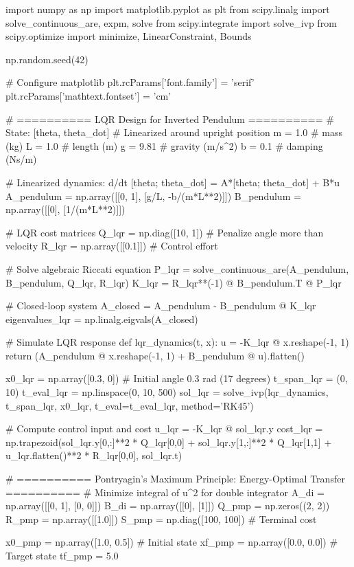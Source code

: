 \documentclass[a4paper, 11pt]{article}
\begin{document}
\begin{pycode}
import numpy as np
import matplotlib.pyplot as plt
from scipy.linalg import solve_continuous_are, expm, solve
from scipy.integrate import solve_ivp
from scipy.optimize import minimize, LinearConstraint, Bounds

np.random.seed(42)

# Configure matplotlib
plt.rcParams['font.family'] = 'serif'
plt.rcParams['mathtext.fontset'] = 'cm'

# ========== LQR Design for Inverted Pendulum ==========
# State: [theta, theta_dot]
# Linearized around upright position
m = 1.0  # mass (kg)
L = 1.0  # length (m)
g = 9.81  # gravity (m/s^2)
b = 0.1  # damping (Ns/m)

# Linearized dynamics: d/dt [theta; theta_dot] = A*[theta; theta_dot] + B*u
A_pendulum = np.array([[0, 1],
                       [g/L, -b/(m*L**2)]])
B_pendulum = np.array([[0],
                       [1/(m*L**2)]])

# LQR cost matrices
Q_lqr = np.diag([10, 1])  # Penalize angle more than velocity
R_lqr = np.array([[0.1]])  # Control effort

# Solve algebraic Riccati equation
P_lqr = solve_continuous_are(A_pendulum, B_pendulum, Q_lqr, R_lqr)
K_lqr = R_lqr**(-1) @ B_pendulum.T @ P_lqr

# Closed-loop system
A_closed = A_pendulum - B_pendulum @ K_lqr
eigenvalues_lqr = np.linalg.eigvals(A_closed)

# Simulate LQR response
def lqr_dynamics(t, x):
    u = -K_lqr @ x.reshape(-1, 1)
    return (A_pendulum @ x.reshape(-1, 1) + B_pendulum @ u).flatten()

x0_lqr = np.array([0.3, 0])  # Initial angle 0.3 rad (17 degrees)
t_span_lqr = (0, 10)
t_eval_lqr = np.linspace(0, 10, 500)
sol_lqr = solve_ivp(lqr_dynamics, t_span_lqr, x0_lqr, t_eval=t_eval_lqr, method='RK45')

# Compute control input and cost
u_lqr = -K_lqr @ sol_lqr.y
cost_lqr = np.trapezoid(sol_lqr.y[0,:]**2 * Q_lqr[0,0] + sol_lqr.y[1,:]**2 * Q_lqr[1,1] +
                        u_lqr.flatten()**2 * R_lqr[0,0], sol_lqr.t)

# ========== Pontryagin's Maximum Principle: Energy-Optimal Transfer ==========
# Minimize integral of u^2 for double integrator
A_di = np.array([[0, 1],
                 [0, 0]])
B_di = np.array([[0],
                 [1]])
Q_pmp = np.zeros((2, 2))
R_pmp = np.array([[1.0]])
S_pmp = np.diag([100, 100])  # Terminal cost

x0_pmp = np.array([1.0, 0.5])  # Initial state
xf_pmp = np.array([0.0, 0.0])   # Target state
tf_pmp = 5.0


\end{pycode}
\end{document}
